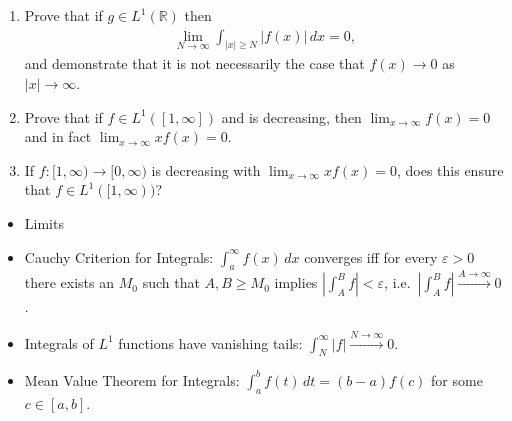 \begin{enumerate}
\def\labelenumi{\alph{enumi}.}
\item
  Prove that if \(g\in L^1({\mathbb{R}})\) then
  \begin{align*}
  \lim_{N\to \infty} \int _{{\left\lvert {x} \right\rvert} \geq N} {\left\lvert {f(x)} \right\rvert} \, dx = 0
  ,\end{align*}
  and demonstrate that it is not necessarily the case that
  \(f(x) \to 0\) as \({\left\lvert {x} \right\rvert}\to \infty\).
\item
  Prove that if \(f\in L^1([1, \infty])\) and is decreasing, then
  \(\lim_{x\to\infty}f(x) =0\) and in fact
  \(\lim_{x\to \infty} xf(x) = 0\).
\item
  If \(f: [1, \infty) \to [0, \infty)\) is decreasing with
  \(\lim_{x\to \infty} xf(x) = 0\), does this ensure that
  \(f\in L^1([1, \infty))\)?
\end{enumerate}

\begin{concept}

\envlist

\begin{itemize}
\tightlist
\item
  Limits
\item
  Cauchy Criterion for Integrals: \(\int_a^\infty f(x) \,dx\) converges
  iff for every \({\varepsilon}>0\) there exists an \(M_0\) such that
  \(A,B\geq M_0\) implies
  \({\left\lvert {\int_A^B f} \right\rvert} < {\varepsilon}\),
  i.e.~\({\left\lvert {\int_A^B f} \right\rvert} \overset{A\to\infty}\to 0\).
\item
  Integrals of \(L^1\) functions have vanishing tails:
  \(\int_{N}^\infty {\left\lvert {f} \right\rvert} \overset{N\to\infty}\longrightarrow 0\).
\item
  Mean Value Theorem for Integrals: \(\int_a^b f(t)\, dt = (b-a) f(c)\)
  for some \(c\in [a, b]\).
\end{itemize}

\end{concept}

